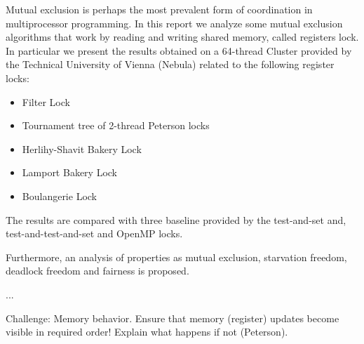 Mutual exclusion is perhaps the most prevalent form of coordination in multiprocessor programming. In this report we analyze some mutual exclusion algorithms that work by reading and writing shared memory, called registers lock. In particular we present the results obtained on a 64-thread Cluster provided by the Technical University of Vienna (Nebula) related to the following register locks:

\begin{itemize}
	\item Filter Lock
	\item Tournament tree of 2-thread Peterson locks
	\item Herlihy-Shavit Bakery Lock
	\item Lamport Bakery Lock
	\item Boulangerie Lock
\end{itemize}

The results are compared with three baseline provided by the test-and-set and, test-and-test-and-set and OpenMP locks.

Furthermore, an analysis of properties as mutual exclusion, starvation freedom, deadlock freedom and fairness is proposed.


...


Challenge: Memory behavior. Ensure that memory (register)
updates become visible in required order! Explain what happens if
not (Peterson).